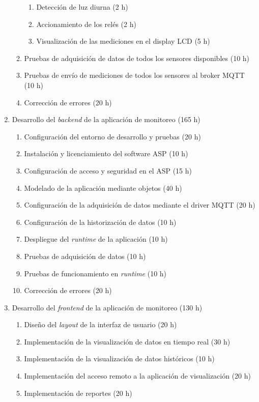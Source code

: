 \documentclass[
11pt, %
]{charter}
\begin{document}
\begin{enumerate}
\begin{enumerate}
\begin{enumerate}[label*=\arabic*.,ref=\theenumii.\arabic*]
			\item Detección de luz diurna (2 h)
			\item Accionamiento de los relés (2 h)
			\item Visualización de las mediciones en el display LCD (5 h)
		\end{enumerate}
		\item Pruebas de adquisición de datos de todos los sensores disponibles (10 h)
		\item Pruebas de envío de mediciones de todos los sensores al broker MQTT (10 h)
		\item Corrección de errores (20 h)
	\end{enumerate}
	\item Desarrollo del \textit{backend} de la aplicación de monitoreo (165 h)
	\begin{enumerate}
		\item Configuración del entorno de desarrollo y pruebas (20 h)
		\item Instalación y licenciamiento del software ASP (10 h)
		\item Configuración de acceso y seguridad en el ASP (15 h)
		\item Modelado de la aplicación mediante objetos (40 h)
		\item Configuración de la adquisición de datos mediante el driver MQTT (20 h)
		\item Configuración de la historización de datos (10 h)
		\item Despliegue del \textit{runtime} de la aplicación (10 h)
		\item Pruebas de adquisición de datos (10 h)
		\item Pruebas de funcionamiento en \textit{runtime} (10 h)
		\item Corrección de errores (20 h)
	\end{enumerate}
	\item Desarrollo del \textit{frontend} de la aplicación de monitoreo (130 h)
	\begin{enumerate}
		\item Diseño del \textit{layout} de la interfaz de usuario (20 h)
		\item Implementación de la visualización de datos en tiempo real (30 h)
		\item Implementación de la visualización de datos históricos (10 h)
		\item Implementación del acceso remoto a la aplicación de visualización (20 h)
		\item Implementación de reportes (20 h)

\end{enumerate}
\end{enumerate}
\end{document}
